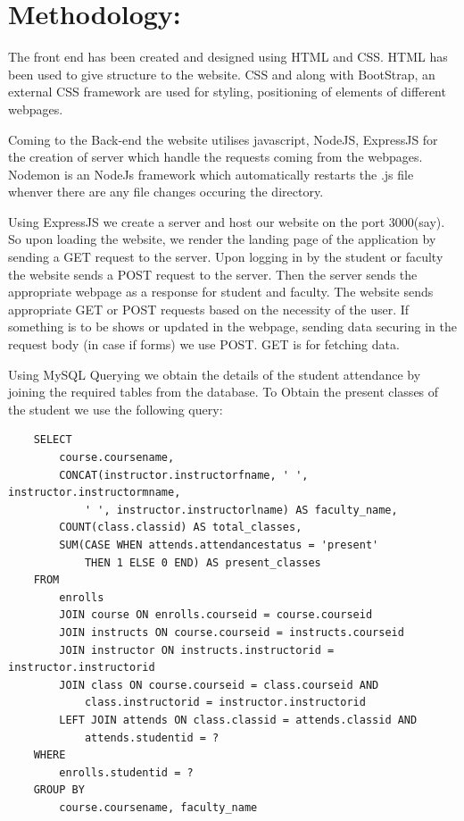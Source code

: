 \documentclass{article}
\begin{document}
\section*{\LARGE{Methodology:}}
\begin{large}
    The front end has been created and designed using HTML and CSS. HTML has been used to give structure to the website.
    CSS and along with BootStrap, an external CSS framework are used for styling, positioning of elements of different webpages.

    \vspace*{0.5cm}

    \par
    Coming to the Back-end the website utilises javascript, NodeJS, ExpressJS for the creation of server which handle the requests coming
    from the webpages. Nodemon is an NodeJs framework which automatically restarts the .js file whenver there are any file changes occuring the
    directory.

    \vspace*{0.5cm}

    \par
    Using ExpressJS we create a server and host our website on the port 3000(say). So upon loading the website, we render the landing page of the application
    by sending a GET request to the server. Upon logging in by the student or faculty the website sends a POST request to the server.
    Then the server sends the appropriate webpage as a response for student and faculty. The website sends appropriate GET or POST requests based on the necessity 
    of the user. If something is to be shows or updated in the webpage, sending data securing in the request body (in case if forms) we use POST.
    GET is for fetching data.
    
    \vspace*{0.5cm}

    \par

    Using MySQL Querying we obtain the details of the student attendance by joining the required tables from the database.
    To Obtain the present classes of the student we use the following query:
    \newpage
    \begin{verbatim}
    SELECT 
        course.coursename, 
        CONCAT(instructor.instructorfname, ' ', instructor.instructormname,
            ' ', instructor.instructorlname) AS faculty_name,
        COUNT(class.classid) AS total_classes,
        SUM(CASE WHEN attends.attendancestatus = 'present' 
            THEN 1 ELSE 0 END) AS present_classes
    FROM 
        enrolls
        JOIN course ON enrolls.courseid = course.courseid
        JOIN instructs ON course.courseid = instructs.courseid
        JOIN instructor ON instructs.instructorid = instructor.instructorid
        JOIN class ON course.courseid = class.courseid AND 
            class.instructorid = instructor.instructorid
        LEFT JOIN attends ON class.classid = attends.classid AND 
            attends.studentid = ?
    WHERE 
        enrolls.studentid = ?
    GROUP BY 
        course.coursename, faculty_name 


\end{verbatim}
\end{large}
\end{document}
